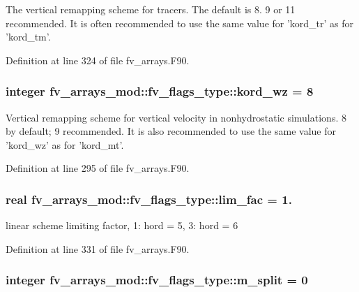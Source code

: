 The vertical remapping scheme for tracers. The default is 8. 9 or 11 recommended. It is often recommended to use the same value for 'kord\-\_\-tr' as for 'kord\-\_\-tm'. 



Definition at line 324 of file fv\-\_\-arrays.\-F90.

\subsubsection[{kord\-\_\-wz}]{\setlength{\rightskip}{0pt plus 5cm}integer fv\-\_\-arrays\-\_\-mod\-::fv\-\_\-flags\-\_\-type\-::kord\-\_\-wz = 8}\label{structfv__arrays__mod_1_1fv__flags__type_a956b1eda2db234dc8646d547c3197c81}


Vertical remapping scheme for vertical velocity in nonhydrostatic simulations. 8 by default; 9 recommended. It is also recommended to use the same value for 'kord\-\_\-wz' as for 'kord\-\_\-mt'. 



Definition at line 295 of file fv\-\_\-arrays.\-F90.

\subsubsection[{lim\-\_\-fac}]{\setlength{\rightskip}{0pt plus 5cm}real fv\-\_\-arrays\-\_\-mod\-::fv\-\_\-flags\-\_\-type\-::lim\-\_\-fac = 1.}\label{structfv__arrays__mod_1_1fv__flags__type_aae1e7bd5b47feab9a53a8de279ae17e6}


linear scheme limiting factor, 1\-: hord = 5, 3\-: hord = 6 



Definition at line 331 of file fv\-\_\-arrays.\-F90.

\subsubsection[{m\-\_\-split}]{\setlength{\rightskip}{0pt plus 5cm}integer fv\-\_\-arrays\-\_\-mod\-::fv\-\_\-flags\-\_\-type\-::m\-\_\-split = 0}\label{structfv__arrays__mod_1_1fv__flags__type_a2cd3cf16f02e720572e7c87e3a6956d6}


